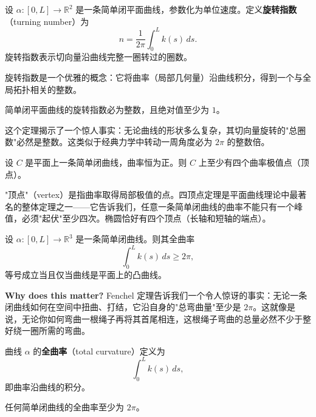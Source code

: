 \begin{Definition}[旋转指数]\label{def:turning-number-ch1}
设 $\alpha: [0, L] \to \mathbb{R}^2$ 是一条简单闭平面曲线，参数化为单位速度。定义\textbf{旋转指数}（turning number）为
\[
n = \frac{1}{2\pi} \int_0^L k(s) \, ds.
\]
旋转指数表示切向量沿曲线完整一圈转过的圈数。
\end{Definition}

旋转指数是一个优雅的概念：它将曲率（局部几何量）沿曲线积分，得到一个与全局拓扑相关的整数。

\begin{Theorem}[旋转指数定理]\label{th:turning-number}
简单闭平面曲线的旋转指数必为整数，且绝对值至少为 $1$。
\end{Theorem}

这个定理揭示了一个惊人事实：无论曲线的形状多么复杂，其切向量旋转的"总圈数"必然是整数。这类似于经典力学中转动一周角度必为 $2\pi$ 的整数倍。

\begin{Theorem}[四顶点定理]\label{th:four-vertex-ch1}
设 $C$ 是平面上一条简单闭曲线，曲率恒为正。则 $C$ 上至少有四个曲率极值点（顶点）。
\end{Theorem}

"顶点"（vertex）是指曲率取得局部极值的点。四顶点定理是平面曲线理论中最著名的整体定理之一——它告诉我们，任意一条简单闭曲线的曲率不能只有一个峰值，必须"起伏"至少四次。椭圆恰好有四个顶点（长轴和短轴的端点）。

\begin{Theorem}[Fenchel 定理]\label{th:fenchel-ch1}
设 $\alpha: [0, L] \to \mathbb{R}^3$ 是一条简单闭曲线。则其全曲率
\[
\int_0^L k(s) \, ds \geq 2\pi,
\]
等号成立当且仅当曲线是平面上的凸曲线。
\end{Theorem}

\textbf{Why does this matter?} Fenchel 定理告诉我们一个令人惊讶的事实：无论一条闭曲线如何在空间中扭曲、打结，它沿自身的"总弯曲量"至少是 $2\pi$。这就像是说，无论你如何弯曲一根绳子再将其首尾相连，这根绳子弯曲的总量必然不少于整好绕一圈所需的弯曲。

\begin{Definition}[全曲率]\label{def:total-curvature-ch1}
曲线 $\alpha$ 的\textbf{全曲率}（total curvature）定义为
\[
\int_0^L k(s) \, ds,
\]
即曲率沿曲线的积分。
\end{Definition}

\begin{Corollary}\label{cor:fenchel-corollary-ch1}
任何简单闭曲线的全曲率至少为 $2\pi$。
\end{Corollary}

